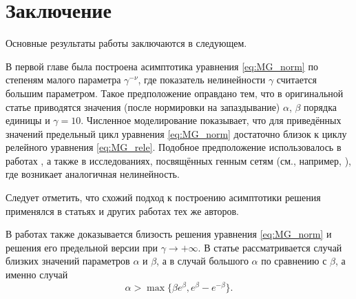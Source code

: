 \chapter*{Заключение}                       %


Основные результаты работы заключаются в следующем.


В первой главе была построена асимптотика уравнения \eqref{eq:MG_norm} по степеням малого параметра $\gamma^{-\nu}$, где показатель нелинейности $\gamma$ считается большим параметром. Такое предположение оправдано тем, что в оригинальной статье \cite{Mackey1977} приводятся значения (после нормировки на запаздывание) $\alpha$, $\beta$ порядка единицы и $\gamma = 10$. Численное моделирование показывает, что для приведённых значений предельный цикл уравнения \eqref{eq:MG_norm} достаточно близок к циклу релейного уравнения \eqref{eq:MG_rele}. Подобное предположение использовалось в работах \cite{Bartha2021, Krisztin2020}, а также в исследованиях, посвящённых генным сетям (см., например, \cite{Volokitin2004}), где возникает аналогичная нелинейность.

Следует отметить, что схожий подход к построению асимптотики решения применялся в статьях \cite{Kolesov2010, Kolesov1997, Glyzin2013} и других работах тех же авторов.

В работах \cite{Bartha2021, Krisztin2020} также доказывается близость решения уравнения \eqref{eq:MG_norm} и решения его предельной версии при $\gamma \to +\infty$. В статье \cite{Krisztin2020} рассматривается случай близких значений параметров $\alpha$ и $\beta$, а в \cite{Bartha2021} случай большого $\alpha$ по сравнению с $\beta$, а именно случай 
\begin{equation*}
	\label{eq:cond_Bartha}
	\alpha > \max\{\beta e^\beta, e^\beta - e^{-\beta}\}.   
\end{equation*}

